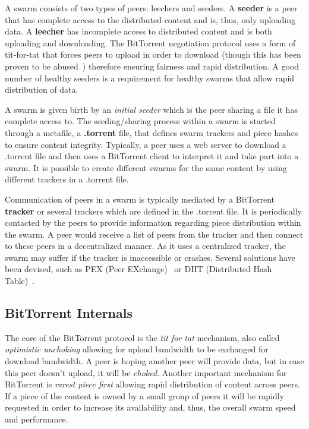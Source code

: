 A swarm consists of two types of peers: leechers and seeders. A
\textbf{seeder} is a peer that has complete access to the distributed content
and is, thus, only uploading data. A \textbf{leecher} has incomplete access to
distributed content and is both uploading and downloading. The BitTorrent
negotiation protocol uses a form of tit-for-tat that forces peers to upload in
order to download (though this has been proven to be
abused~\cite{free-riding}) therefore ensuring fairness and rapid distribution.
A good number of healthy seeders is a requirement for healthy swarms that
allow rapid distribution of data.

A swarm is given birth by an \textit{initial seeder} which is the peer sharing
a file it has complete access to. The seeding/sharing process within a swarm
is started through a metafile, a \textbf{.torrent} file, that defines swarm
trackers and piece hashes to ensure content integrity. Typically, a peer uses
a web server to download a .torrent file and then uses a BitTorrent client to
interpret it and take part into a swarm. It is possible to create different
swarms for the same content by using different trackers in a .torrent file.

Communication of peers in a swarm is typically mediated by a BitTorrent
\textbf{tracker} or several trackers which are defined in the .torrent file.
It is periodically contacted by the peers to provide information regarding
piece distribution within the swarm. A peer would receive a list of peers from
the tracker and then connect to these peers in a decentralized manner. As it
uses a centralized tracker, the swarm may suffer if the tracker is
inaccessible or crashes. Several solutions have been devised, such as PEX
(Peer EXchange)~\cite{pex} or DHT (Distributed Hash Table)~\cite{dht-paper}.


\subsection{BitTorrent Internals}

The core of the BitTorrent protocol is the \textit{tit for tat} mechanism,
also called \textit{optimistic unchoking} allowing for upload bandwidth to be
exchanged for download bandwidth. A peer is hoping another peer will provide
data, but in case this peer doesn't upload, it will be \textit{choked}.
Another important mechanism for BitTorrent is \textit{rarest piece first}
allowing rapid distribution of content across peers. If a piece of the content
is owned by a small group of peers it will be rapidly requested in order to
increase its availability and, thus, the overall swarm speed and performance.


